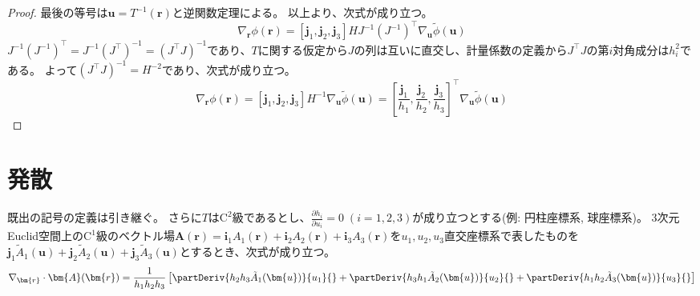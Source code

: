 \begin{proof}
            最後の等号は$\bm{u} = T^{-1}(\bm{r})$と逆関数定理による。
            以上より、次式が成り立つ。
            \[ \nabla_\bm{r}\phi(\bm{r}) = [\bm{j}_1,\bm{j}_2,\bm{j}_3]HJ^{-1}\left(J^{-1}\right)^\top\nabla_\bm{u}\tilde{\phi}(\bm{u}) \]
            $J^{-1}\left(J^{-1}\right)^\top = J^{-1}\left(J^\top\right)^{-1} = \left(J^\top J\right)^{-1}$であり、$T$に関する仮定から$J$の列は互いに直交し、計量係数の定義から$J^\top J$の第$i$対角成分は$h_i^2$である。
            よって$\left(J^\top J\right)^{-1} = H^{-2}$であり、次式が成り立つ。
            \[ \nabla_\bm{r}\phi(\bm{r}) = [\bm{j}_1,\bm{j}_2,\bm{j}_3]H^{-1}\nabla_\bm{u}\tilde{\phi}(\bm{u}) = \left[\frac{\bm{j}_1}{h_1}, \frac{\bm{j}_2}{h_2}, \frac{\bm{j}_3}{h_3}\right]^\top\nabla_\bm{u}\tilde{\phi}(\bm{u}) \]
        \end{proof}
    \section{発散}
        \label{発散}
        \begin{shadebox}
            既出の記号の定義は引き継ぐ。
            さらに$T$は$\textrm{C}^2$級であるとし、$\frac{\partial h_i}{\partial u_i} = 0\;(i=1,2,3)$が成り立つとする(例: 円柱座標系, 球座標系)。
            3次元Euclid空間上の$\mathrm{C}^1$級のベクトル場$\bm{A}(\bm{r}) = \bm{i}_1 A_1(\bm{r}) + \bm{i}_2 A_2(\bm{r}) + \bm{i}_3 A_3(\bm{r})$を$u_1,u_2,u_3$直交座標系で表したものを$\bm{j}_1 \tilde{A}_1(\bm{u}) + \bm{j}_2 \tilde{A}_2(\bm{u}) + \bm{j}_3 \tilde{A}_3(\bm{u})$とするとき、次式が成り立つ。
            \[ \nabla_\bm{r}\cdot\bm{A}(\bm{r}) = \frac{1}{h_1 h_2 h_3}\left[ \partDeriv{h_2 h_3 \tilde{A}_1(\bm{u})}{u_1}{} + \partDeriv{h_3 h_1 \tilde{A}_2(\bm{u})}{u_2}{} + \partDeriv{h_1 h_2 \tilde{A}_3(\bm{u})}{u_3}{} \right] \]
        \end{shadebox}
